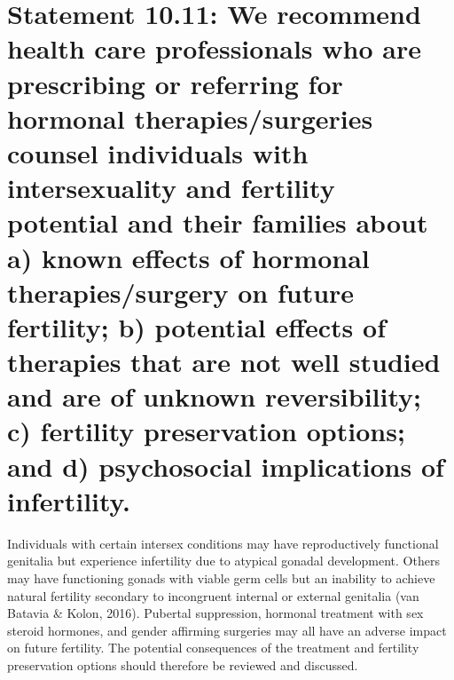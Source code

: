 \documentclass[
]{book}
\begin{document}
\hypertarget{statement-10.11-we-recommend-health-care-professionals-who-are-prescribing-or-referring-for-hormonal-therapiessurgeries-counsel-individuals-with-intersexuality-and-fertility-potential-and-their-families-about-a-known-effects-of-hormonal-therapiessurgery-on-future-fertility-b-potential-effects-of-therapies-that-are-not-well-studied-and-are-of-unknown-reversibility-c-fertility-preservation-options-and-d-psychosocial-implications-of-infertility.}{%
\section*{Statement 10.11: We recommend health care professionals who are prescribing or referring for hormonal therapies/surgeries counsel individuals with intersexuality and fertility potential and their families about a) known effects of hormonal therapies/surgery on future fertility; b) potential effects of therapies that are not well studied and are of unknown reversibility; c) fertility preservation options; and d) psychosocial implications of infertility.}\label{statement-10.11-we-recommend-health-care-professionals-who-are-prescribing-or-referring-for-hormonal-therapiessurgeries-counsel-individuals-with-intersexuality-and-fertility-potential-and-their-families-about-a-known-effects-of-hormonal-therapiessurgery-on-future-fertility-b-potential-effects-of-therapies-that-are-not-well-studied-and-are-of-unknown-reversibility-c-fertility-preservation-options-and-d-psychosocial-implications-of-infertility.}}

Individuals with certain intersex conditions
may have reproductively functional genitalia but
experience infertility due to atypical gonadal
development. Others may have functioning
gonads with viable germ cells but an inability to
achieve natural fertility secondary to incongruent
internal or external genitalia (van Batavia \&
Kolon, 2016). Pubertal suppression, hormonal
treatment with sex steroid hormones, and gender
affirming surgeries may all have an adverse
impact on future fertility. The potential consequences of the treatment and fertility preservation
options should therefore be reviewed and
discussed.
\end{document}
